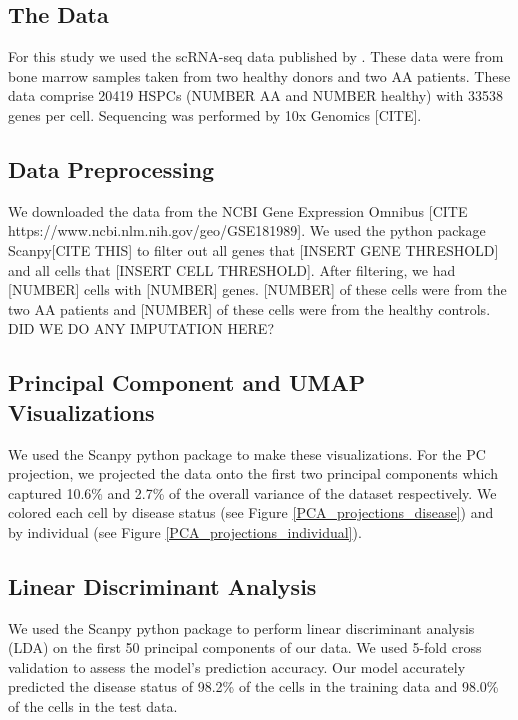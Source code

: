 \documentclass{article}
\begin{document}
\subsection{The Data}
For this study we used the scRNA-seq data published by \citet{tonglin_single-cell_2022}.
These data were from bone marrow samples taken from two healthy donors and two AA patients.
These data comprise 20419 HSPCs (NUMBER AA and NUMBER healthy) with 33538 genes per cell.
Sequencing was performed by 10x Genomics [CITE].

\subsection{Data Preprocessing}
We downloaded the data from the NCBI Gene Expression Omnibus [CITE https://www.ncbi.nlm.nih.gov/geo/GSE181989].
We used the python package Scanpy[CITE THIS] to filter out all genes that [INSERT GENE THRESHOLD] and all cells that [INSERT CELL THRESHOLD].
After filtering, we had [NUMBER] cells with [NUMBER] genes.
[NUMBER] of these cells were from the two AA patients and [NUMBER] of these cells were from the healthy controls.
DID WE DO ANY IMPUTATION HERE?

\subsection{Principal Component and UMAP Visualizations}
We used the Scanpy python package to make these visualizations.
For the PC projection, we projected the data onto the first two principal components which captured 10.6\% and 2.7\% of the overall variance of the dataset respectively.
We colored each cell by disease status (see Figure \ref{PCA_projections_disease}) and by individual (see Figure \ref{PCA_projections_individual}).

\subsection{Linear Discriminant Analysis}
We used the Scanpy python package to perform linear discriminant analysis (LDA) on the first 50 principal components of our data.
We used 5-fold cross validation to assess the model's prediction accuracy.
Our model accurately predicted the disease status of 98.2\% of the cells in the training data and 98.0\% of the cells in the test data.
\end{document}
